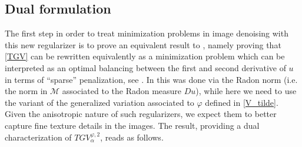 \documentclass[a4paper,11pt,oneside,notitlepage]{article}
\numberwithin{equation}{section}
\newcommand{\vphi}{\varphi}
\begin{document}

\subsection{Dual formulation}
\label{sec:dual_formulations}

The first step in order to treat minimization problems in image denoising with this new regularizer is to prove an equivalent result to \cite[Theorem 3.1]{BV20}, namely proving that \eqref{TGV} can be rewritten equivalently as a minimization problem which can be interpreted as an optimal balancing between the first and second derivative of $u$ in terms of “sparse” penalization, see \cite[Remark 3.2]{BV20}. In \cite{BV20} this was done via the Radon norm (i.e. the norm in $\mathcal M$ associated to the Radon measure $Du$), while here we need to use the variant of the generalized variation associated to $\vphi$ defined in \eqref{V_tilde}.  Given the anisotropic nature of such regularizers, we expect them to better capture fine texture details in the images. The result, providing a dual characterization of $TGV^{\vphi,2}_\alpha$, reads as follows.
\end{document}

